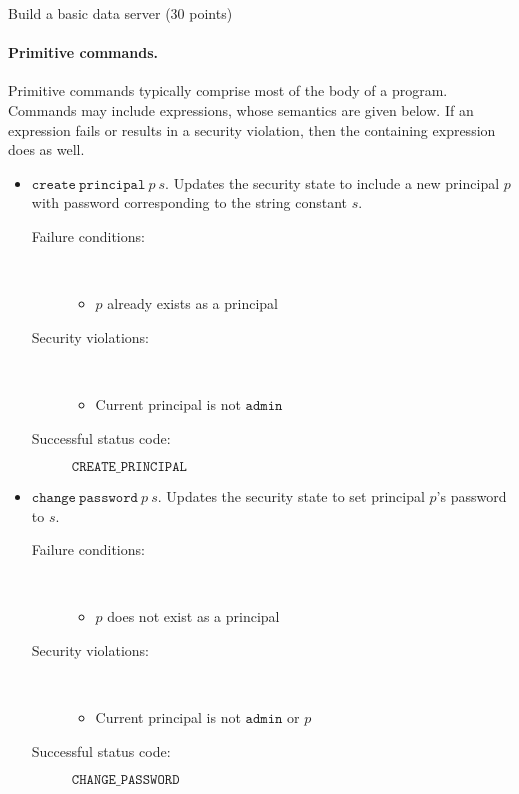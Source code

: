 \documentclass[11pt]{article}
\begin{document}
\begin{problem}{Build a basic data server (30 points)}
\paragraph{Primitive commands.} Primitive commands typically comprise most of the body of a program. Commands may include expressions, whose semantics are given below. If an expression fails or results in a security violation, then the containing expression does as well.
\begin{itemize}
\item $\mathtt{create\ principal}\ \mathit{p}\ \mathit{s}$. Updates the security state to include a new principal $p$ with password corresponding to the string constant $s$.
\begin{description}
\item[Failure conditions:]\ \\[-1.5em]
\begin{itemize}
\item $p$ already exists as a principal
\end{itemize}
\item[Security violations:]\ \\[-1.5em]
\begin{itemize}
\item Current principal is not $\mathtt{admin}$
\end{itemize}
\item[Successful status code:] $\mathtt{CREATE\_PRINCIPAL}$
\end{description}

\item $\mathtt{change\ password}\ \mathit{p}\ \mathit{s}$. Updates the security state to set principal $p$'s password to $\mathit{s}$.
\begin{description}
\item[Failure conditions:]\ \\[-1.5em]
\begin{itemize}
\item $p$ does not exist as a principal
\end{itemize}
\item[Security violations:]\ \\[-1.5em]
\begin{itemize}
\item Current principal is not $\mathtt{admin}$ or $p$
\end{itemize}
\item[Successful status code:] $\mathtt{CHANGE\_PASSWORD}$
\end{description}


\end{itemize}
\end{problem}
\end{document}
